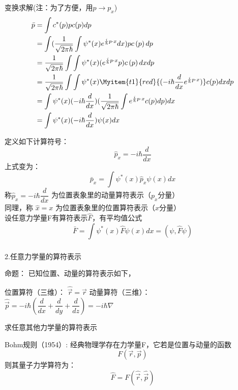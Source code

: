 \begin{frame}
    变换求解(注：为了方便，用$p \to p_x$)
    \begin{equation*}
        \begin{split}
            \bar{p}&=\int c^{*}(p) p c(p) d p \\  
            &=\int (\frac{1}{\sqrt{2 \pi \hbar}} \int \psi^{*}(x) e^{\frac{i}{\hbar} p\cdot x} d x) p c\left(p\right) d p \\
            &=\frac{1}{\sqrt{2 \pi \hbar}} \int \int \psi^{*}(x) (e^{\frac{i}{\hbar} p\cdot x}  p) c\left(p\right) d xd p \\
            &=\frac{1}{\sqrt{2 \pi \hbar}} \int \int \psi^{*}(x) \Myitem{t1}{red}{(-i\hbar\frac{d}{d x} e^{\frac{i}{\hbar} p\cdot x})} c(p) d xd p \\
            &=\int \psi^{*}(x) (-i\hbar\frac{d}{d x}) (\frac{1}{\sqrt{2 \pi \hbar}} \int e^{\frac{i}{\hbar} p\cdot x} c(p) d p)  d x\\
            &=\int \psi^{*}(x) (-i\hbar\frac{d}{d x}) \psi(x)  d x\\
         \end{split}
    \end{equation*}  
\end{frame} 

\begin{frame}
    定义如下计算符号：
    $$ \boxed{\hat{p}_x= -i\hbar\frac{d}{d x}} $$ 
    上式变为：         
    $$\boxed{\bar{p}_x=\int \psi^{*}(x) \hat{p}_x \psi(x) d x} $$
    称$ \hat{p}_x= -i\hbar\dfrac{d}{d x} $ 为位置表象里的动量算符表示（$p_x$分量）\\
    同理，称 $\hat{x}= x $ 为位置表象里的位置算符表示（$x$分量）\\ \vspace{0.3em}
    设任意力学量F有算符表示$\hat{F}$，有平均值公式\\
    $$\boxed{\bar{F}=\int \psi^{*}(x) \hat{F} \psi(x) d x =(\psi, \hat{F} \psi)}$$
\end{frame} 

\begin{frame} 
    \frametitle{}
    2.任意力学量的算符表示
    \begin{tcolorbox1}{命题：}
    已知位置、动量的算符表示如下，
    \begin{itemize}
        \Item  位置算符（三维）： $ \hat{\vec{r}} =\vec{r} $
        \Item  动量算符（三维）： $ \hat{\vec{p}} =-i\hbar(\dfrac{d}{d x}+ \dfrac{d}{d y} + \dfrac{d}{d z})=-i\hbar \nabla $
    \end{itemize}
    求任意其他力学量的算符表示
    \end{tcolorbox1}
    \alert{Bohm规则（1954）:} 经典物理学存在力学量F，它若是位置与动量的函数
    \[F(\vec{r},\vec{p})\]
    则其量子力学算符为：
    \[\hat{F}=F(\hat{\vec{r}},\hat{\vec{p}})\]
\end{frame} 

